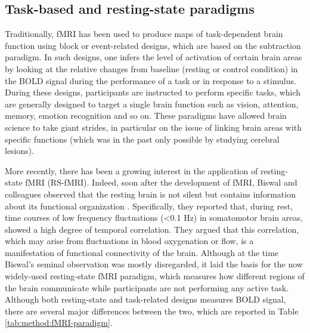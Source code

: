 \subsection{Task-based and resting-state paradigms}
\label{sec:fmri:fmri:paradigm}

Traditionally, fMRI has been used to produce maps of task-dependent brain function using block or event-related designs, which are based on the subtraction paradigm. In such designs, one infers the level of activation of certain brain areas by looking at the relative changes from baseline (resting or control condition) in the BOLD signal during the performance of a task or in response to a stimulus. During these designs, participants are instructed to perform specific tasks, which are generally designed to target a single brain function such as vision, attention, memory, emotion recognition and so on. These paradigms have allowed brain science to take giant strides, in particular on the issue of linking brain areas with specific functions (which was in the past only possible by studying cerebral lesions).

More recently, there has been a growing interest in the application of resting-state fMRI (RS-fMRI). Indeed, soon after the development of fMRI, Biswal and colleagues observed that the resting brain is not silent but contains information about its functional organization \citep{biswal_functional_1995}. Specifically, they reported that, during rest, time courses of low frequency fluctuations (<0.1 Hz) in somatomotor brain areas, showed a high degree of temporal correlation. They argued that this correlation, which may arise from fluctuations in blood oxygenation or flow, is a manifestation of functional connectivity of the brain. Although at the time Biswal’s seminal observation was mostly disregarded, it laid the basis for the now widely-used resting-state fMRI paradigm, which measures how different regions of the brain communicate while participants are not performing any active task. Although both resting-state and task-related designs measures BOLD signal, there are several major differences between the two, which are reported in Table \ref{tab:method:fMRI-paradigm}.

